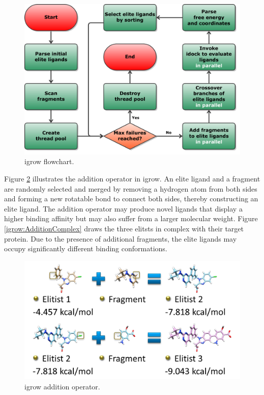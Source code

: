 \begin{figure}
\centering
\includegraphics[width=\textwidth]{igrow/Flowchart.pdf}
\caption{igrow flowchart.}
\label{igrow:Flowchart}
\end{figure}

Figure \ref{igrow:Addition} illustrates the addition operator in igrow. An elite ligand and a fragment are randomly selected and merged by removing a hydrogen atom from both sides and forming a new rotatable bond to connect both sides, thereby constructing an elite ligand. The addition operator may produce novel ligands that display a higher binding affinity but may also suffer from a larger molecular weight. Figure \ref{igrow:AdditionComplex} draws the three elitsts in complex with their target protein. Due to the presence of additional fragments, the elite ligands may occupy significantly different binding conformations.

\begin{figure}
\centering
\includegraphics[width=\textwidth]{igrow/Addition.png}
\caption{igrow addition operator.}
\label{igrow:Addition}
\end{figure}

